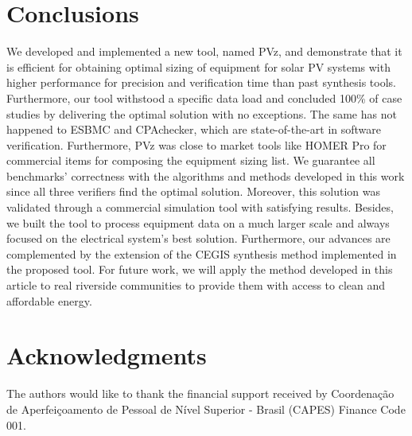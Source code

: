 \documentclass[review]{elsarticle}
\begin{document}
\section{Conclusions} 
\label{sec:Conclusions}
We developed and implemented a new tool, named PVz, and demonstrate that it is efficient for obtaining optimal sizing of equipment for solar PV systems with higher performance for precision and verification time than past synthesis tools. Furthermore, our tool withstood a specific data load and concluded 100\% of case studies by delivering the optimal solution with no exceptions. The same has not happened to ESBMC and CPAchecker, which are state-of-the-art in software verification. Furthermore, PVz was close to market tools like HOMER Pro for commercial items for composing the equipment sizing list. We guarantee all benchmarks' correctness with the algorithms and methods developed in this work since all three verifiers find the optimal solution.
Moreover, this solution was validated through a commercial simulation tool with satisfying results. Besides, we built the tool to process equipment data on a much larger scale and always focused on the electrical system's best solution. Furthermore, our advances are complemented by the extension of the CEGIS synthesis method implemented in the proposed tool. For future work, we will apply the method developed in this article to real riverside communities to provide them with access to clean and affordable energy.

\section*{Acknowledgments}
The authors would like to thank the financial support received by Coordenação de Aperfeiçoamento de Pessoal de Nível Superior - Brasil (CAPES) Finance Code 001.

%
%

%
%


%
\end{document}
